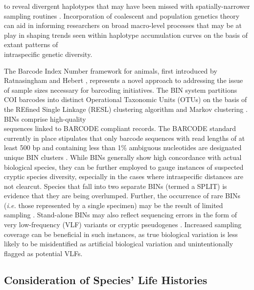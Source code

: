 to reveal divergent haplotypes that may have been missed with spatially-narrower sampling routines \cite{monaghan2009accelerated}. Incorporation of coalescent and population genetics theory can aid in informing researchers on broad macro-level processes that may be at play in shaping trends seen within haplotype accumulation curves on the basis of extant patterns of \\ intraspecific genetic diversity. 


 
The Barcode Index Number framework for animals, first introduced by Ratnasingham and Hebert \cite{ratnasingham2013dna}, represents a novel approach to addressing the issue of sample sizes necessary for barcoding initiatives. The BIN system partitions COI barcodes into distinct Operational Taxonomic Units (OTUs) on the basis of the REfined Single Linkage (RESL) clustering algorithm and Markov clustering \cite{ratnasingham2013dna}. BINs comprise high-quality \\ sequences linked to BARCODE compliant records. The BARCODE standard currently in place stipulates that only barcode sequences with read lengths of at least 500 bp and containing less than 1\% ambiguous nucleotides are designated unique BIN clusters \cite{hanner2009data}. While BINs generally show high concordance with actual biological species, they can be further employed to gauge instances of suspected cryptic species diversity, especially in the cases where intraspecific distances are not clearcut.  Species that fall into two separate BINs (termed a SPLIT) is evidence that they are being overlumped. Further, the occurrence of rare BINs (\textit{i.e.} those represented by a single specimen) may be the result of limited sampling \cite{hausmann2013genetic, huemer2014testing}. Stand-alone BINs may also reflect sequencing errors in the form of very low-frequency (VLF) variants or cryptic pseudogenes \cite{stoeckle2012frequency, stoeckle2014dna}. Increased sampling coverage can be beneficial in such instances, as true biological variation is less likely to be misidentified as artificial biological variation and unintentionally flagged as potential VLFs.



\subsection{Consideration of Species' Life Histories}

